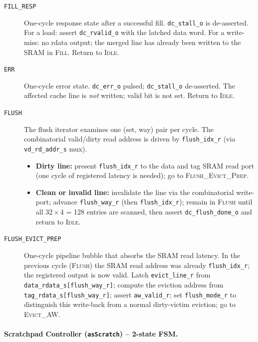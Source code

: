 \begin{description}
  \item[\texttt{FILL\_RESP}]
    One-cycle response state after a successful fill.
    \texttt{dc\_stall\_o} is de-asserted.
    For a load: assert \texttt{dc\_rvalid\_o} with the latched data word.
    For a write-miss: no rdata output; the merged line has already been
    written to the SRAM in \textsc{Fill}.
    Return to \textsc{Idle}.

  \item[\texttt{ERR}]
    One-cycle error state.
    \texttt{dc\_err\_o} pulsed; \texttt{dc\_stall\_o} de-asserted.
    The affected cache line is \emph{not} written; valid bit is not set.
    Return to \textsc{Idle}.

  \item[\texttt{FLUSH}]
    The flush iterator examines one (set, way) pair per cycle.
    The combinatorial valid/dirty read address is driven by
    \texttt{flush\_idx\_r} (via \texttt{vd\_rd\_addr\_s} mux).
    \begin{itemize}
      \item \textbf{Dirty line:} present \texttt{flush\_idx\_r} to the
        data and tag SRAM read port (one cycle of registered latency
        is needed); go to \textsc{Flush\_Evict\_Prep}.
      \item \textbf{Clean or invalid line:} invalidate the line via the
        combinatorial write-port; advance \texttt{flush\_way\_r} (then
        \texttt{flush\_idx\_r}); remain in \textsc{Flush} until all
        32\,$\times$\,4 = 128 entries are scanned, then assert
        \texttt{dc\_flush\_done\_o} and return to \textsc{Idle}.
    \end{itemize}

  \item[\texttt{FLUSH\_EVICT\_PREP}]
    One-cycle pipeline bubble that absorbs the SRAM read latency.
    In the previous cycle (\textsc{Flush}) the SRAM read address was
    already \texttt{flush\_idx\_r}; the registered output is now valid.
    Latch \texttt{evict\_line\_r} from \texttt{data\_rdata\_s[flush\_way\_r]};
    compute the eviction address from
    \texttt{tag\_rdata\_s[flush\_way\_r]};
    assert \texttt{aw\_valid\_r}; set \texttt{flush\_mode\_r} to
    distinguish this write-back from a normal dirty-victim eviction;
    go to \textsc{Evict\_AW}.

\end{description}

\paragraph{Scratchpad Controller (\texttt{asScratch}) -- 2-state FSM.}

